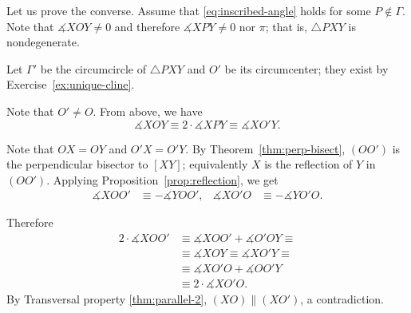 Let us prove the converse.
Assume that \ref{eq:inscribed-angle} holds for some $P\notin \Gamma$.
Note that $\measuredangle X O Y\ne 0$ and therefore $\measuredangle X P Y\ne 0$ nor $\pi$;
that is, $\triangle PXY$ is nondegenerate.

Let $\Gamma'$ be the circumcircle of $\triangle PXY$
and $O'$ be its circumcenter;
they exist by Exercise~\ref{ex:unique-cline}.


Note that $O'\ne O$.
From above, we have 
$$\measuredangle X O Y\equiv 2\cdot\measuredangle X P Y\equiv \measuredangle X O' Y.$$

Note that $OX=OY$ and $O'X=O'Y$.
By Theorem~\ref{thm:perp-bisect},
$(OO')$ is the perpendicular bisector to $[XY]$;
equivalently $X$ is the reflection of $Y$ in $(OO')$.
Applying Proposition~\ref{prop:reflection}, we get
\begin{align*}
\measuredangle X O O'&\equiv -\measuredangle Y O O',
&
\measuredangle X O' O&\equiv -\measuredangle Y O' O.
\end{align*}

Therefore 
\begin{align*}
2\cdot \measuredangle X O O'
&\equiv\measuredangle X O O'+\measuredangle O' O Y
\equiv
\\
&\equiv \measuredangle X O Y\equiv \measuredangle X O' Y\equiv
\\
&\equiv\measuredangle X O' O+\measuredangle O O' Y
\\
&\equiv 2\cdot \measuredangle X O' O.
\end{align*}
By Transversal property \ref{thm:parallel-2},
$(X O)\parallel (XO')$, a contradiction.
\qeds

